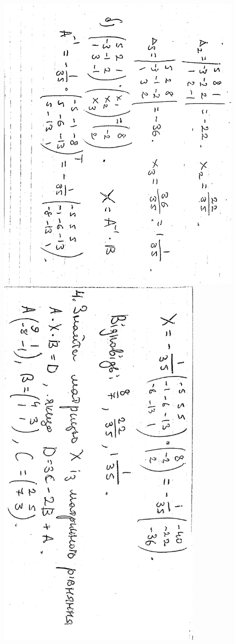 \documentclass{article}
\begin{document}
\includegraphics[width=12cm,angle=90]{ons/4.jpg}\\
\includegraphics[width=10cm,angle=90]{ons/5.jpg}\\
\end{document}
